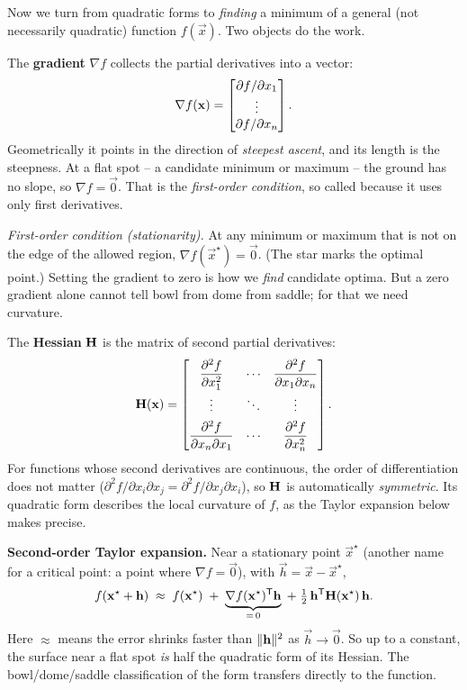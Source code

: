 Now we turn from quadratic forms to \emph{finding} a minimum of a general (not
necessarily quadratic) function $f(\vec{x})$. Two objects do the work.

The \textbf{gradient} $\nabla f$ collects the partial derivatives into a vector:
\[
  \nabla f(\mathbf{x}) = \begin{bmatrix}\partial f/\partial x_1 \\ \vdots \\ \partial f/\partial x_n\end{bmatrix}.
\]
Geometrically it points in the direction of \emph{steepest ascent}, and its length is
the steepness. At a flat spot -- a candidate minimum or maximum -- the ground has no
slope, so $\nabla f=\vec{0}$. That is the \emph{first-order condition}, so called
because it uses only first derivatives.

\begin{focusbox}
\emph{First-order condition (stationarity).} At any minimum or maximum that is not on
the edge of the allowed region, $\nabla f(\vec{x}^\star)=\vec{0}$. (The star marks the
optimal point.) Setting the gradient to zero is how we
\emph{find} candidate optima. But a zero gradient alone cannot tell bowl from dome
from saddle; for that we need curvature.
\end{focusbox}

The \textbf{Hessian} $\mathbf{H}$ is the matrix of second partial derivatives:
\[
  \mathbf{H}(\mathbf{x}) = \begin{bmatrix}
   \dfrac{\partial^2 f}{\partial x_1^2} & \cdots & \dfrac{\partial^2 f}{\partial x_1\partial x_n}\\[8pt]
   \vdots & \ddots & \vdots\\[4pt]
   \dfrac{\partial^2 f}{\partial x_n\partial x_1} & \cdots & \dfrac{\partial^2 f}{\partial x_n^2}
  \end{bmatrix}.
\]
For functions whose second derivatives are continuous, the order of differentiation
does not matter ($\partial^2 f/\partial x_i\partial x_j = \partial^2 f/\partial
x_j\partial x_i$), so $\mathbf{H}$ is automatically \emph{symmetric}.
Its quadratic form describes the local curvature of $f$, as the Taylor expansion
below makes precise.

\begin{formalbox}
\label{ch36:thm-taylor}
\textbf{Second-order Taylor expansion.} Near a stationary point $\vec{x}^\star$ (another
name for a critical point: a point where $\nabla f=\vec{0}$), with
$\vec{h}=\vec{x}-\vec{x}^\star$,
\[
  f(\mathbf{x}^\star+\mathbf{h}) \;\approx\; f(\mathbf{x}^\star) \;+\; \underbrace{\nabla f(\mathbf{x}^\star)^{\mathsf{T}}\mathbf{h}}_{=\,0}
  \;+\; \tfrac12\,\mathbf{h}^{\mathsf{T}}\mathbf{H}(\mathbf{x}^\star)\,\mathbf{h}.
\]
Here $\approx$ means the error shrinks faster than $\lVert\mathbf{h}\rVert^2$ as $\vec{h}\to\vec{0}$.
So up to a constant, the surface near a flat spot \emph{is} half the quadratic form of its
Hessian. The bowl/dome/saddle classification of the form transfers directly to the
function.
\end{formalbox}

